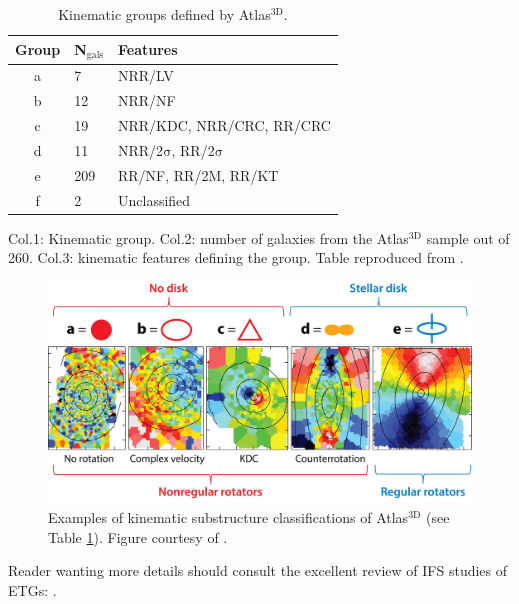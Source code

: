 	\begin{table}
		\centering
	\begin{threeparttable}
		\caption{Kinematic groups defined by Atlas$^\text{3D}$.}
		\label{tab:KinGroups}
		\begin{tabular}{c l l}
			\hline
			\hline
			Group 	& N$_\text{gals}$ & Features \\
			\hline
			a 		& 7			& NRR/LV \\
			b 		& 12		& NRR/NF \\
			c 		& 19		& NRR/KDC, NRR/CRC, RR/CRC \\
			d 		& 11		& NRR/2$\mathrm{\sigma}$, RR/2$\mathrm{\sigma}$ \\
			e 		& 209		& RR/NF, RR/2M, RR/KT \\
			f 		& 2			& Unclassified \\
			\hline
			\hline
		\end{tabular}
		\begin{tablenotes}
		\item Col.1: Kinematic group. Col.2: number of galaxies from the Atlas$^\text{3D}$ sample out of 260. Col.3: kinematic features defining the group. Table reproduced from \citet{Krajnovic2011}.
		\end{tablenotes}
	\end{threeparttable}
	\end{table}

	\begin{figure}
		\centering
		\includegraphics[width=\textwidth]{introduction/substructure.jpeg}
		\caption[Examples of kinematic substructure classifications]{Examples of kinematic substructure classifications of Atlas$^\text{3D}$ (see Table \ref{tab:KinGroups}). Figure courtesy of \citet{Cappellari2016}.}
		\label{fig:EgSubstructure}
	\end{figure}

	Reader wanting more details should consult the excellent review of IFS studies of ETGs: \citet{Cappellari2016}. 



